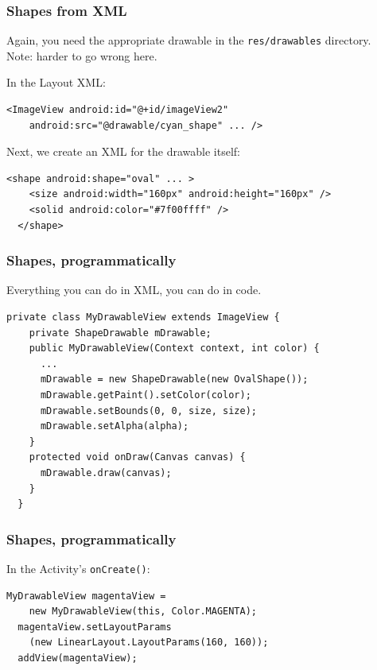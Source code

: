 \begin{frame}[fragile]
\frametitle{Shapes from XML}

\begin{changemargin}{1cm}
Again, you need the appropriate drawable in the {\tt res/drawables} directory.\\[1em]
Note: harder to go wrong here.

In the Layout XML:
\begin{lstlisting}[basicstyle=\scriptsize]
  <ImageView android:id="@+id/imageView2"
    android:src="@drawable/cyan_shape" ... />
\end{lstlisting}

Next, we create an XML for the drawable itself:
\begin{lstlisting}[basicstyle=\scriptsize]
  <shape android:shape="oval" ... >
    <size android:width="160px" android:height="160px" />
    <solid android:color="#7f00ffff" />
  </shape>
\end{lstlisting}

\end{changemargin}
\end{frame}

\begin{frame}[fragile]
\frametitle{Shapes, programmatically}
\begin{changemargin}{1cm}
Everything you can do in XML, you can do in code.

\begin{lstlisting}[basicstyle=\scriptsize]
  private class MyDrawableView extends ImageView {
    private ShapeDrawable mDrawable;
    public MyDrawableView(Context context, int color) {
      ...
      mDrawable = new ShapeDrawable(new OvalShape());
      mDrawable.getPaint().setColor(color);
      mDrawable.setBounds(0, 0, size, size);
      mDrawable.setAlpha(alpha);
    }
    protected void onDraw(Canvas canvas) {
      mDrawable.draw(canvas);
    }
  }
\end{lstlisting}

\end{changemargin}
\end{frame}

\begin{frame}[fragile]
\frametitle{Shapes, programmatically}
\begin{changemargin}{1cm}
In the Activity's {\tt onCreate()}:
\begin{lstlisting}[basicstyle=\scriptsize]
  MyDrawableView magentaView = 
    new MyDrawableView(this, Color.MAGENTA);
  magentaView.setLayoutParams
    (new LinearLayout.LayoutParams(160, 160));
  addView(magentaView);
\end{lstlisting}
\end{changemargin}
\end{frame}

